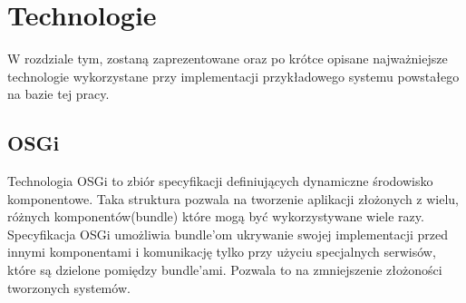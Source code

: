 \ifpdf
    \graphicspath{{3/figures/PNG/}{3/figures/PDF/}{3/figures/}}
\else
    \graphicspath{{3/figures/EPS/}{3/figures/}}
\fi
\chapter{Technologie} %


W rozdziale tym, zostaną zaprezentowane oraz po krótce opisane najważniejsze technologie wykorzystane przy implementacji przykładowego systemu  powstałego na bazie tej pracy.

\section{OSGi}
Technologia OSGi to zbiór specyfikacji definiujących dynamiczne środowisko komponentowe. Taka struktura pozwala na tworzenie aplikacji złożonych z wielu, różnych komponentów(bundle) które mogą być wykorzystywane wiele razy. Specyfikacja OSGi umożliwia bundle'om ukrywanie swojej implementacji przed innymi komponentami i komunikację tylko przy użyciu specjalnych serwisów, które są dzielone pomiędzy bundle'ami. Pozwala to na zmniejszenie złożoności tworzonych systemów.
\newpage

